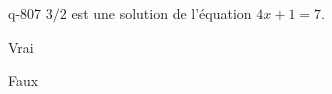 \begin{truefalse}{q-807}
$3/2$ est une solution de l'équation $4x+1=7$.
\item* Vrai
\item Faux
\end{truefalse}

